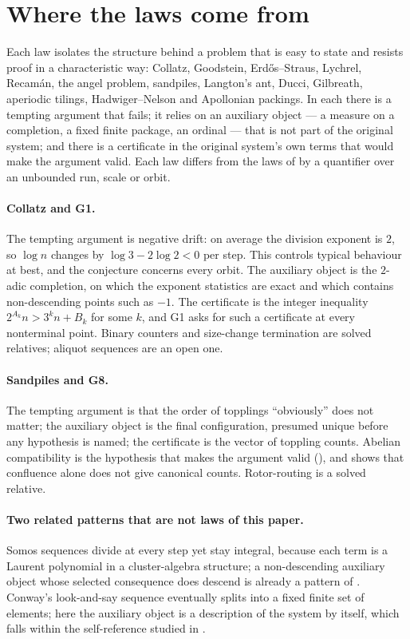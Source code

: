 \section{Where the laws come from}
\label{supp:method}

Each law isolates the structure behind a problem that is easy to state and resists proof in a
characteristic way: Collatz, Goodstein, Erd\H{o}s--Straus, Lychrel, Recam\'an, the angel problem,
sandpiles, Langton's ant, Ducci, Gilbreath, aperiodic tilings, Hadwiger--Nelson and Apollonian
packings. In each there is a tempting argument that fails; it relies on an auxiliary object --- a
measure on a completion, a fixed finite package, an ordinal --- that is not part of the original
system; and there is a certificate in the original system's own terms that would make the argument
valid. Each law differs from the laws of \citet{Tsiokos2026FoundIV} by a quantifier over an
unbounded run, scale or orbit.

\paragraph{Collatz and G1.} The tempting argument is negative drift: on average the division
exponent is $2$, so $\log n$ changes by $\log 3 - 2\log 2 < 0$ per step. This controls typical
behaviour at best, and the conjecture concerns every orbit. The auxiliary object is the $2$-adic
completion, on which the exponent statistics are exact and which contains non-descending points
such as $-1$. The certificate is the integer inequality $2^{A_k} n > 3^k n + B_k$ for some $k$, and
G1 asks for such a certificate at every nonterminal point. Binary counters and size-change
termination are solved relatives; aliquot sequences are an open one.

\paragraph{Sandpiles and G8.} The tempting argument is that the order of topplings ``obviously''
does not matter; the auxiliary object is the final configuration, presumed unique before any
hypothesis is named; the certificate is the vector of toppling counts. Abelian compatibility is the
hypothesis that makes the argument valid (), and  shows that confluence
alone does not give canonical counts. Rotor-routing is a solved relative.

\paragraph{Two related patterns that are not laws of this paper.} Somos sequences divide at every
step yet stay integral, because each term is a Laurent polynomial in a cluster-algebra structure; a
non-descending auxiliary object whose selected consequence does descend is already a pattern of
\citet{Tsiokos2026FoundIV}. Conway's look-and-say sequence eventually splits into a fixed finite set
of elements; here the auxiliary object is a description of the system by itself, which falls within
the self-reference studied in \citet{FoundationsVCognition}.
